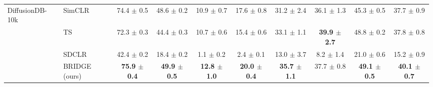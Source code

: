 \begin{table}[t]
\begin{adjustbox}{max width=\textwidth}
\begin{tabular}{l l c c c c c c c c}
\midrule
DiffusionDB-10k & SimCLR & 74.4 {\scriptsize$\pm$ 0.5} & 48.6 {\scriptsize$\pm$ 0.2} & 10.9 {\scriptsize$\pm$ 0.7} & 17.6 {\scriptsize$\pm$ 0.8} & 31.2 {\scriptsize$\pm$ 2.4} & 36.1 {\scriptsize$\pm$ 1.3} & 45.3 {\scriptsize$\pm$ 0.5} & 37.7 {\scriptsize$\pm$ 0.9} \\
 & TS & 72.3 {\scriptsize$\pm$ 0.3} & 44.4 {\scriptsize$\pm$ 0.3} & 10.7 {\scriptsize$\pm$ 0.6} & 15.4 {\scriptsize$\pm$ 0.6} & 33.1 {\scriptsize$\pm$ 1.1} & \textbf{39.9 {\scriptsize$\pm$ 2.7}} & 48.8 {\scriptsize$\pm$ 0.2} & 37.8 {\scriptsize$\pm$ 0.8} \\
 & SDCLR & 42.4 {\scriptsize$\pm$ 0.2} & 18.4 {\scriptsize$\pm$ 0.2} & 1.1 {\scriptsize$\pm$ 0.2} & 2.4 {\scriptsize$\pm$ 0.1} & 13.0 {\scriptsize$\pm$ 3.7} & 8.2 {\scriptsize$\pm$ 1.4} & 21.0 {\scriptsize$\pm$ 0.6} & 15.2 {\scriptsize$\pm$ 0.9} \\
\rowcolor{blue!10} & BRIDGE (ours) & \textbf{75.9 {\scriptsize$\pm$ 0.4}} & \textbf{49.9 {\scriptsize$\pm$ 0.5}} & \textbf{12.8 {\scriptsize$\pm$ 1.0}} & \textbf{20.0 {\scriptsize$\pm$ 0.4}} & \textbf{35.7 {\scriptsize$\pm$ 1.1}} & 37.7 {\scriptsize$\pm$ 0.8} & \textbf{49.1 {\scriptsize$\pm$ 0.5}} & \textbf{40.1 {\scriptsize$\pm$ 0.7}} \\
\bottomrule
\end{tabular}
\end{adjustbox}
\end{table}
